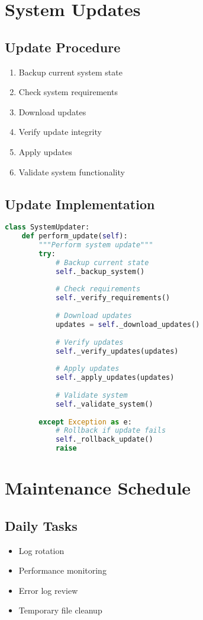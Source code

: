 \section{System Updates}

\subsection{Update Procedure}
\begin{enumerate}
    \item Backup current system state
    \item Check system requirements
    \item Download updates
    \item Verify update integrity
    \item Apply updates
    \item Validate system functionality
\end{enumerate}

\subsection{Update Implementation}
\begin{lstlisting}[language=Python]
class SystemUpdater:
    def perform_update(self):
        """Perform system update"""
        try:
            # Backup current state
            self._backup_system()
            
            # Check requirements
            self._verify_requirements()
            
            # Download updates
            updates = self._download_updates()
            
            # Verify updates
            self._verify_updates(updates)
            
            # Apply updates
            self._apply_updates(updates)
            
            # Validate system
            self._validate_system()
            
        except Exception as e:
            # Rollback if update fails
            self._rollback_update()
            raise
\end{lstlisting}

\section{Maintenance Schedule}

\subsection{Daily Tasks}
\begin{itemize}
    \item Log rotation
    \item Performance monitoring
    \item Error log review
    \item Temporary file cleanup
\end{itemize}

